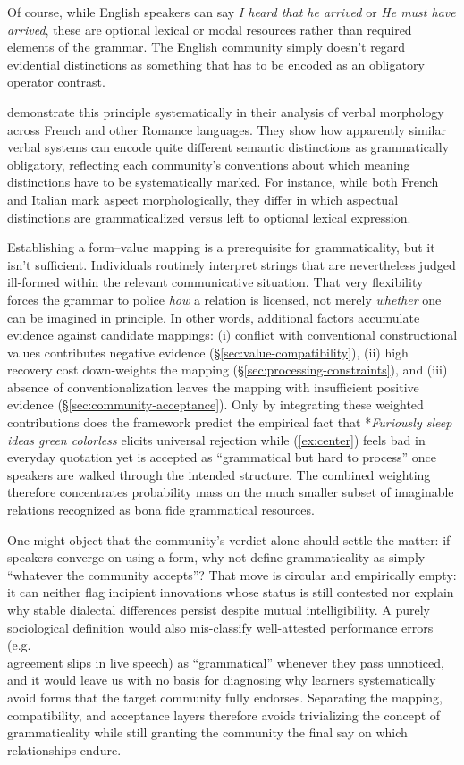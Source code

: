 \documentclass[12pt,letterpaper]{article}
\newcommand{\mention}[1]{\textit{#1}}
\begin{document}
Of course, while English speakers can say \mention{I heard that he arrived} or \mention{He must have arrived}, these are optional lexical or modal resources rather than required elements of the grammar. The English community simply doesn't regard evidential distinctions as something that has to be encoded as an obligatory operator contrast.

\textcite{kilani2005} demonstrate this principle systematically in their analysis of verbal morphology across French and other Romance languages. They show how apparently similar verbal systems can encode quite different semantic distinctions as grammatically obligatory, reflecting each community's conventions about which meaning distinctions have to be systematically marked. For instance, while both French and Italian mark aspect morphologically, they differ in which aspectual distinctions are grammaticalized versus left to optional lexical expression.

Establishing a form--value mapping is a prerequisite for grammaticality, but it isn't sufficient. Individuals routinely interpret strings that are nevertheless judged ill-formed within the relevant communicative situation. That very flexibility forces the grammar to police \emph{how} a relation is licensed, not merely \emph{whether} one can be imagined in principle. In other words, additional factors accumulate evidence against candidate mappings: (i) conflict with conventional constructional values contributes negative evidence (\S\ref{sec:value-compatibility}), (ii) high recovery cost down-weights the mapping (\S\ref{sec:processing-constraints}), and (iii) absence of conventionalization leaves the mapping with insufficient positive evidence (\S\ref{sec:community-acceptance}). Only by integrating these weighted contributions does the framework predict the empirical fact that *\textit{Furiously sleep ideas green colorless} elicits universal rejection while (\ref{ex:center}) feels bad in everyday quotation yet is accepted as \enquote{grammatical but hard to process} once speakers are walked through the intended structure. The combined weighting therefore concentrates probability mass on the much smaller subset of imaginable relations recognized as bona fide grammatical resources.

One might object that the community's verdict alone should settle the matter: if speakers converge on using a form, why not define grammaticality as simply \enquote{whatever the community accepts}? That move is circular and empirically empty: it can neither flag incipient innovations whose status is still contested nor explain why stable dialectal differences persist despite mutual intelligibility. A purely sociological definition would also mis-classify well-attested performance errors (e.g.\\ agreement slips in live speech) as \enquote{grammatical} whenever they pass unnoticed, and it would leave us with no basis for diagnosing why learners systematically avoid forms that the target community fully endorses. Separating the mapping, compatibility, and acceptance layers therefore avoids trivializing the concept of grammaticality while still granting the community the final say on which relationships endure.
\end{document}
